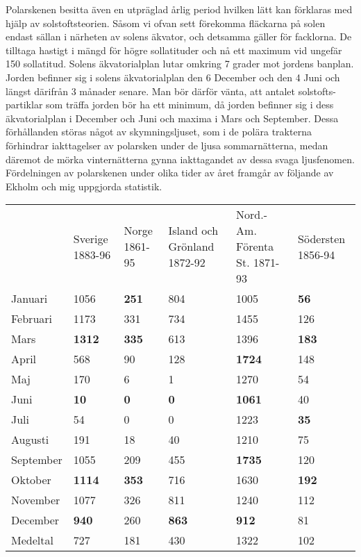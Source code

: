 \documentclass[a4paper, 12pt, oneside, swedish]{article}
\begin{document}
Polarskenen besitta även en utpräglad årlig period hvilken lätt kan förklaras med hjälp av solstoftsteorien. Såsom vi ofvan sett förekomma fläckarna på solen endast sällan i närheten av solens äkvator, och detsamma gäller för facklorna. De tilltaga hastigt i mängd för högre sollatituder och nå ett maximum vid ungefär 150 sollatitud. Solens äkvatorialplan lutar omkring 7 grader mot jordens banplan. Jorden befinner sig i solens äkvatorialplan den 6 December och den 4 Juni och längst därifrån 3 månader senare. Man bör därför vänta, att antalet solstofts-partiklar som träffa jorden bör ha ett minimum, då jorden befinner sig i dess äkvatorialplan i December och Juni och maxima i Mars och September. Dessa förhållanden störas något av skymningsljuset, som i de polära trakterna förhindrar iakttagelser av polarsken under de ljusa sommarnätterna, medan däremot de mörka vinternätterna gynna iakttagandet av dessa svaga ljusfenomen. Fördelningen av polarskenen under olika tider av året framgår av följande av Ekholm och mig uppgjorda statistik.

\begin{table}[H]
    \centering
    \footnotesize
    \begin{tabular}{p{15mm} p{15mm} p{15mm} p{18mm} p{18mm} p{15mm}}
        ~ & Sverige 1883-96 & Norge 1861-95 & Island och Grönland 1872-92 & Nord.-Am. Förenta St. 1871-93 & Södersten 1856-94 \\
        Januari & 1056 & \textbf{251} & 804 & 1005 & \textbf{56}  \\
        Februari & 1173 & 331 & 734 & 1455 & 126 \\
        Mars & \textbf{1312} & \textbf{335} & 613 & 1396 & \textbf{183}  \\
        April & 568 & 90 & 128 & \textbf{1724} & 148 \\
        Maj & 170 & 6 & 1 & 1270 & 54 \\
        Juni & \textbf{10} & \textbf{0} & \textbf{0} & \textbf{1061} & 40 \\
        Juli & 54 & 0 & 0 & 1223 & \textbf{35} \\
        Augusti & 191 & 18 & 40 & 1210 & 75 \\
        September & 1055 & 209 & 455 & \textbf{1735} & 120 \\
        Oktober & \textbf{1114} & \textbf{353} & 716 & 1630 & \textbf{192} \\
        November & 1077 & 326 & 811 & 1240 & 112 \\
        December & \textbf{940} & 260 & \textbf{863} & \textbf{912} & 81 \\
        Medeltal & 727 & 181 & 430 & 1322 & 102 \\
    \end{tabular}
\end{table}
\end{document}

